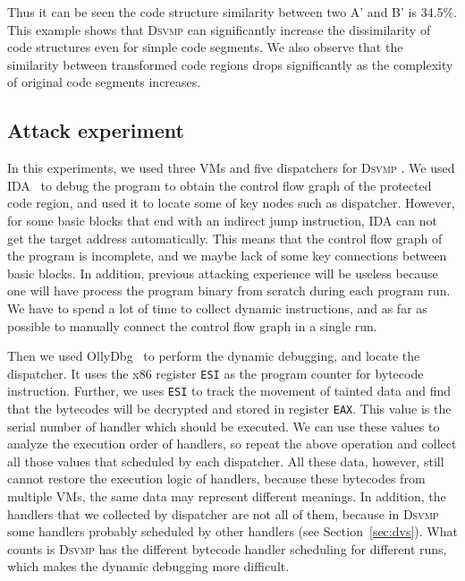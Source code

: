 \documentclass[times]{secauth}
\newcommand{\DSVMP}{\textsc{Dsvmp }}
\newcommand\FIXME[1]{\textcolor{red}{FIX:}\textcolor{red}{#1}}
\begin{document}
Thus it can be seen the code structure similarity between two A' and B' is  34.5\%.
This example shows that \DSVMP can significantly increase the dissimilarity of code structures even for simple code segments.
We also observe that the similarity between transformed code regions drops significantly
as the complexity of original code segments increases.


\subsection{Attack experiment}
In this experiments, we used three VMs and five dispatchers for \DSVMP. We used IDA~\cite{14Idapro} to debug the program to obtain the control flow graph of the protected code region, and used it to locate some of key nodes such as dispatcher.
However, for some basic blocks that end with an indirect jump instruction, IDA can not get the target address automatically. This means that the control flow graph of the program is incomplete, and we maybe lack of some key connections between basic blocks. In addition, previous attacking experience will be useless because one will have process the program binary from scratch during each program run.
We have to spend a lot of time to collect dynamic instructions, and as far as possible to manually connect the control flow graph in a single run.

Then we used OllyDbg~\cite{15Ollydbg} to perform the dynamic debugging, and locate the dispatcher. It uses the x86 register \texttt{ESI} as the program counter for bytecode instruction. Further, we uses \texttt{ESI} to track the movement of tainted data and find that the bytecodes will be decrypted and stored in register \texttt{EAX}. This value is the serial number of handler which should be executed. We can use these values to analyze the execution order of handlers, so repeat the above operation and collect all those values that scheduled by each dispatcher. All these data, however, still cannot restore the execution logic of handlers, because these bytecodes from multiple VMs, the same data may represent different meanings. In addition, the handlers that we collected by dispatcher are not all of them, because in \DSVMP some handlers probably scheduled by other handlers (see Section~\ref{sec:dvs}). What counts is \DSVMP has the different bytecode handler scheduling for different runs, which makes the dynamic debugging more difficult.
\end{document}
